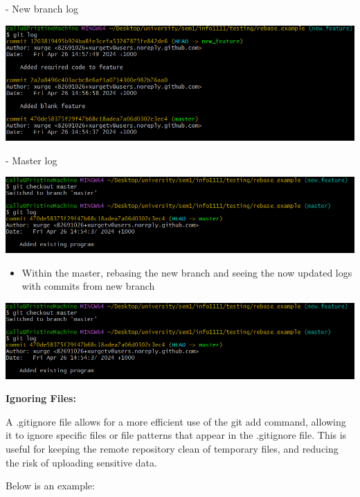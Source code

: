 \documentclass[a4paper, 11pt]{report}
\begin{document}
- New branch log

\includegraphics[width=1.1\textwidth]{rebasenewlogs}

- Master log

\includegraphics[width=1.1\textwidth]{rebasenewlogsmaster}
\begin{itemize}
\item Within the master, rebasing the new branch and seeing the now updated logs with commits from new branch
\end{itemize}
\includegraphics[width=1.1\textwidth]{rebaserebaselogcheck}
 
\vspace{\baselineskip}
 \textbf{Ignoring Files:}

A .gitignore file allows for a more efficient use of the git add command, allowing it to ignore specific files or file patterns that appear in the .gitignore file.  This  is useful for keeping the remote repository clean of temporary files, and reducing the risk of uploading sensitive data. 

Below is an example: 
\end{document}
